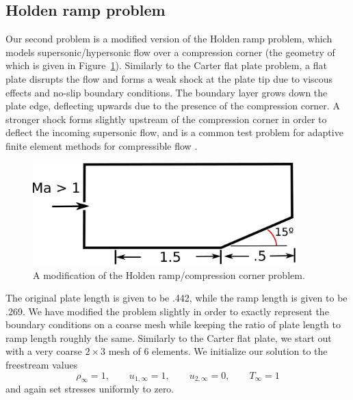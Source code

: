 
\subsection{Holden ramp problem}

Our second problem is a modified version of the Holden ramp problem, which models supersonic/hypersonic flow over a compression corner (the geometry of which is given in Figure~\ref{fig:holdenCartoon}).  Similarly to the Carter flat plate problem, a flat plate disrupts the flow and forms a weak shock at the plate tip due to viscous effects and no-slip boundary conditions.  The boundary layer grows down the plate edge, deflecting upwards due to the presence of the compression corner.  A stronger shock forms slightly upstream of the compression corner in order to deflect the incoming supersonic flow, and is a common test problem for adaptive finite element methods for compressible flow \cite{Rachowicz1997231,Barter,BenKirk}.  

\begin{figure}
\centering
\includegraphics[width=4in]{holden.pdf}
\caption{A modification of the Holden ramp/compression corner problem.}
\label{fig:holdenCartoon}
\end{figure}

The original plate length is given to be .442, while the ramp length is given to be .269. We have modified the problem slightly in order to exactly represent the boundary conditions on a coarse mesh while keeping the ratio of plate length to ramp length roughly the same. Similarly to the Carter flat plate, we start out with a very coarse $2 \times 3$ mesh of 6 elements.  We initialize our solution to the freestream values
\[
\rho_{\infty} = 1,\qquad u_{1,\infty}= 1,\qquad u_{2,\infty} = 0, \qquad T_{\infty} = 1
\]
and again set stresses uniformly to zero.   

